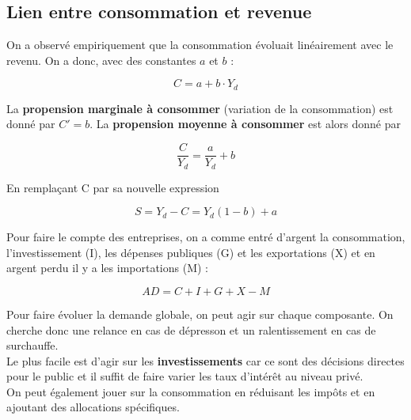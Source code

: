 \subsection{Lien entre consommation et revenue}
On a observé empiriquement que la consommation évoluait linéairement avec le revenu. On a donc, avec des constantes $a$ et $b$ :

\begin{equation}
C = a + b \cdot Y_d 
\end{equation}

La \textbf{propension marginale à consommer} (variation de la consommation) est donné par $C' = b$. La \textbf{propension moyenne à consommer} est alors donné par 

\begin{equation}
\frac{C}{Y_d} = \frac{a}{Y_d} + b
\end{equation}

En remplaçant C par sa nouvelle expression

\begin{equation}
S = Y_d - C = Y_d(1-b) + a
\end{equation}

Pour faire le compte des entreprises, on a comme entré d'argent la consommation, l'investissement (I), les dépenses publiques (G) et les exportations (X) et en argent perdu il y a les importations (M) : 

\begin{equation}
AD = C + I + G + X - M
\end{equation}

Pour faire évoluer la demande globale, on peut agir sur chaque composante. On cherche donc une relance en cas de dépresson et un ralentissement en cas de surchauffe. \\
Le plus facile est d'agir sur les \textbf{investissements} car ce sont des décisions directes pour le public et il suffit de faire varier les taux d'intérêt au niveau privé. \\
On peut également jouer sur la consommation en réduisant les impôts et en ajoutant des allocations spécifiques. 


